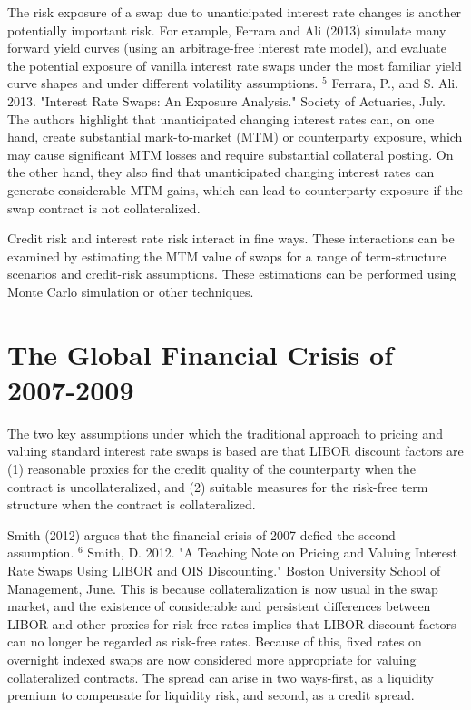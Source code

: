 \documentclass[11pt]{article}
\begin{document}
The risk exposure of a swap due to unanticipated interest rate changes is another potentially important risk. For example, Ferrara and Ali (2013) simulate many forward yield curves (using an arbitrage-free interest rate model), and evaluate the potential exposure of vanilla interest rate swaps under the most familiar yield curve shapes and under different volatility assumptions. ${ }^{5}$ Ferrara, P., and S. Ali. 2013. "Interest Rate Swaps: An Exposure Analysis." Society of Actuaries, July. The authors highlight that unanticipated changing interest rates can, on one hand, create substantial mark-to-market (MTM) or counterparty exposure, which may cause significant MTM losses and require substantial collateral posting. On the other hand, they also find that unanticipated changing interest rates can generate considerable MTM gains, which can lead to counterparty exposure if the swap contract is not collateralized.

Credit risk and interest rate risk interact in fine ways. These interactions can be examined by estimating the MTM value of swaps for a range of term-structure scenarios and credit-risk assumptions. These estimations can be performed using Monte Carlo simulation or other techniques.

\section*{The Global Financial Crisis of 2007-2009}
The two key assumptions under which the traditional approach to pricing and valuing standard interest rate swaps is based are that LIBOR discount factors are (1) reasonable proxies for the credit quality of the counterparty when the contract is uncollateralized, and (2) suitable measures for the risk-free term structure when the contract is collateralized.

Smith (2012) argues that the financial crisis of 2007 defied the second assumption. ${ }^{6}$ Smith, D. 2012. "A Teaching Note on Pricing and Valuing Interest Rate Swaps Using LIBOR and OIS Discounting." Boston University School of Management, June. This is because collateralization is now usual in the swap market, and the existence of considerable and persistent differences between LIBOR and other proxies for risk-free rates implies that LIBOR discount factors can no longer be regarded as risk-free rates. Because of this, fixed rates on overnight indexed swaps are now considered more appropriate for valuing collateralized contracts. The spread can arise in two ways-first, as a liquidity premium to compensate for liquidity risk, and second, as a credit spread.
\end{document}
